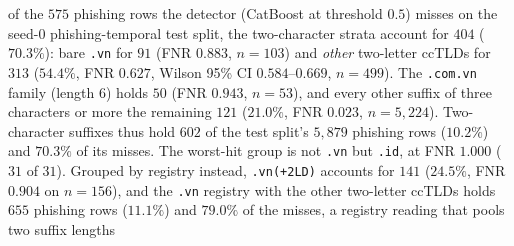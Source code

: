 of the $575$ phishing rows the detector (CatBoost at threshold $0.5$) misses on the seed-0 phishing-temporal test split, the two-character strata account for $404$ ($70.3\%$): bare \texttt{.vn} for $91$ (FNR $0.883$, $n=103$) and \emph{other} two-letter ccTLDs for $313$ ($54.4\%$, FNR $0.627$, Wilson 95\% CI $0.584$--$0.669$, $n=499$). The \texttt{.com.vn} family (length 6) holds $50$ (FNR $0.943$, $n=53$), and every other suffix of three characters or more the remaining $121$ ($21.0\%$, FNR $0.023$, $n=5{,}224$). Two-character suffixes thus hold $602$ of the test split's $5{,}879$ phishing rows ($10.2\%$) and $70.3\%$ of its misses. The worst-hit group is not \texttt{.vn} but \texttt{.id}, at FNR $1.000$ ($31$ of $31$). Grouped by registry instead, \texttt{.vn(+2LD)} accounts for $141$ ($24.5\%$, FNR $0.904$ on $n=156$), and the \texttt{.vn} registry with the other two-letter ccTLDs holds $655$ phishing rows ($11.1\%$) and $79.0\%$ of the misses, a registry reading that pools two suffix lengths%
